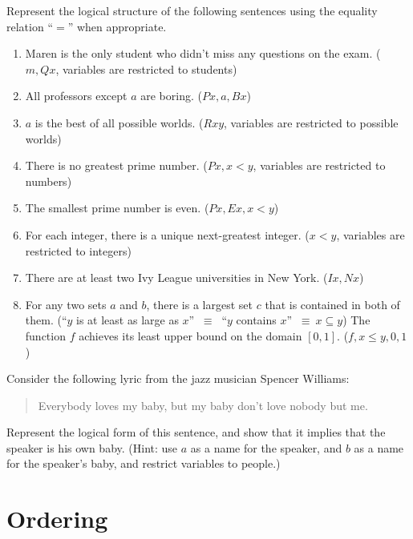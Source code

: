  \begin{exercises} Represent the logical structure of the following
   sentences using the equality relation ``$=$'' when appropriate.
  \begin{enumerate}
  \item Maren is the only student who didn't miss any questions on the
    exam. ($m,Qx$, variables are restricted to students)
  \item All professors except $a$ are boring.  ($Px,a,Bx$)
  \item $a$ is the best of all possible worlds. ($Rxy$, variables are
    restricted to possible worlds)
  \item There is no greatest prime number. ($Px,x<y$, variables are
    restricted to numbers)
  \item The smallest prime number is even. ($Px,Ex,x<y$)
  \item For each integer, there is a unique next-greatest
    integer. ($x<y$, variables are restricted to integers)
  \item There are at least two Ivy League universities in New York. ($Ix,Nx$)
  \item For any two sets $a$ and $b$, there is a largest set $c$ that
    is contained in both of them.  (``$y$ is at least as large as
    $x$'' $\:\equiv\:$ ``$y$ contains $x$'' $\:\equiv\:x\subseteq y$)
    \sitem The function $f$ achieves its least upper bound on the
    domain $[0,1]$. ($f,x\leq y,0,1$)
\end{enumerate}
\end{exercises}

\begin{exercise} Consider the following lyric from the jazz musician
  Spencer Williams:
  \begin{quote} Everybody loves my baby, but my baby don't love nobody
    but me. \end{quote} Represent the logical form of this sentence,
  and show that it implies that the speaker is his own baby.  (Hint:
  use $a$ as a name for the speaker, and $b$ as a name for the
  speaker's baby, and restrict variables to people.)
\end{exercise}


\section{Ordering}

